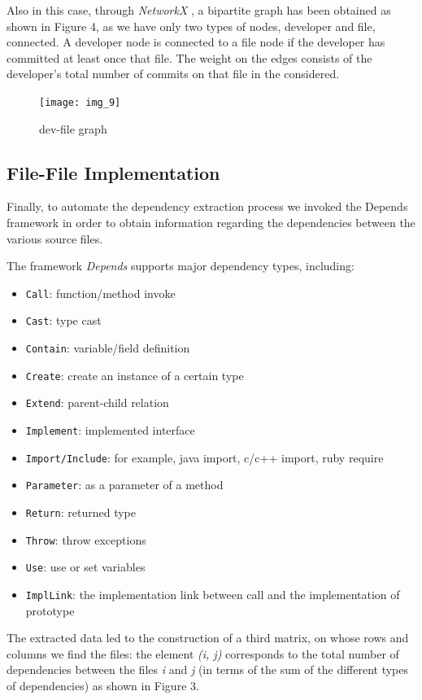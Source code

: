\documentclass[sigconf]{acmart}
\begin{document}
Also in this case, through {\itshape NetworkX} , a bipartite graph has been obtained as shown in Figure 4, as we have only two types of nodes, developer and file, connected. A developer node is connected to a file node if the developer has committed at least once that file. The weight on the edges consists of the developer’s total number of commits on that file in the considered.

\begin{figure}[h]
  \centering
  \texttt{[image: img\_9]}
  \caption{dev-file graph}
  \Description{}
\end{figure}

\subsection{File-File Implementation}
Finally, to automate the dependency extraction process we invoked the Depends framework in order to obtain information regarding the dependencies between the various source files.

The framework {\itshape Depends} supports major dependency types, including:
\begin{itemize}
\item {\verb|Call|}: function/method invoke
\item {\verb|Cast|}: type cast
\item {\verb|Contain|}: variable/field definition
\item {\verb|Create|}: create an instance of a certain type
\item {\verb|Extend|}: parent-child relation
\item {\verb|Implement|}: implemented interface
\item {\verb|Import/Include|}: for example, java import, c/c++ import, ruby require
\item {\verb|Parameter|}: as a parameter of a method
\item {\verb|Return|}: returned type
\item {\verb|Throw|}: throw exceptions
\item {\verb|Use|}: use or set variables
\item {\verb|ImplLink|}: the implementation link between call and the implementation of prototype
\end{itemize}



The extracted data led to the construction of a third matrix, on whose rows and columns we find the files: the element {\itshape (i, j)} corresponds to the total number of dependencies between the files {\itshape i} and {\itshape j} (in terms of the sum of the different types of dependencies) as shown in Figure 3.
\end{document}
